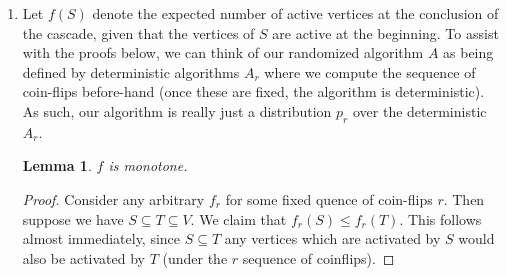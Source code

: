 \documentclass[12pt]{exam}
\newtheorem{lemma}[theorem]{Lemma}
\begin{document}
\begin{questions}
\begin{solution}
\begin{enumerate}[label=(\alph*)]
      \begin{lemma}
        The proposed function $f$ is monotone and submodular.
      \end{lemma}
      \begin{proof}
        Suppose we have $S \subseteq T \subseteq U$. Then:
        \begin{align*}
          f(S) &= \left| \bigcup_{S_i \in S} S_i \right| \tag{Definition} \\
          &\leq \left| \bigcup_{S_i \in S} S_i \cup \bigcup_{S_i \in T \setminus S} S_i \right| \tag{Adding element can only grow the set}  \\
          &= \left| \bigcup_{S_i \in T} S_i  \right| \tag{Definition}
        \end{align*}
        As such $f$ is monotone. Now let us take some $S_* \notin T$.
        \begin{align*}
          f(T \cup \{S_*\}) - f(T) &= f(T) + |\{ s \in S_* \mid s \notin A, \forall A \in T \}| - f(T) \\
          &= |\{ s \in S_* \mid s \notin A, \forall A \in T \}| \\
          &\leq |\{ s \in S_* \mid s \notin A, \forall A \in S \}| \tag{$S \subseteq T$, so there can only be more elements it does not contain} \\
          &= f(S) + |\{ s \in S_* \mid s \notin A, \forall A \in S \}| - f(S) \\
          &= f(S \cup \{S_*\}) - f(S)
        \end{align*}
        As such, we conclude that:
        \begin{align*}
          f(T \cup \{S_*\}) - f(T)) \leq f(S \cup \{S_*\}) - f(S)
        \end{align*}
        which means that $f$ is submodular.
      \end{proof}
    \item
      Let $f(S)$ denote the expected number of active vertices at the conclusion of the cascade, given that the vertices of $S$ are active at the beginning. To assist with the proofs below, we can think of our randomized algorithm $A$ as being defined by deterministic algorithms $A_r$ where we compute the sequence of coin-flips before-hand (once these are fixed, the algorithm is deterministic). As such, our algorithm is really just a distribution $p_r$ over the deterministic $A_r$.
      \begin{lemma}
        $f$ is monotone.
      \end{lemma}
      \begin{proof}
        Consider any arbitrary $f_r$ for some fixed quence of coin-flips $r$. Then suppose we have $S \subseteq T \subseteq V$. We claim that $f_r(S) \leq f_r(T)$. This follows almost immediately, since $S \subseteq T$ any vertices which are activated by $S$ would also be activated by $T$ (under the $r$ sequence of coinflips).


\end{proof}
\end{enumerate}
\end{solution}
\end{questions}
\end{document}
